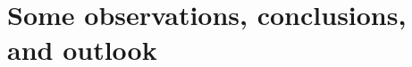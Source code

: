 \documentclass[print,thumbmain]{src/thesis}  %
\begin{document}
\cleardoublepage
\part{Some observations, conclusions, and outlook}\label{part: closing}




\isstarredchaptertrue           %
%


% 
% 

\thispagestyle{empty}

\ifprint{\cleardoublepage}
\else

\fi
\end{document}

